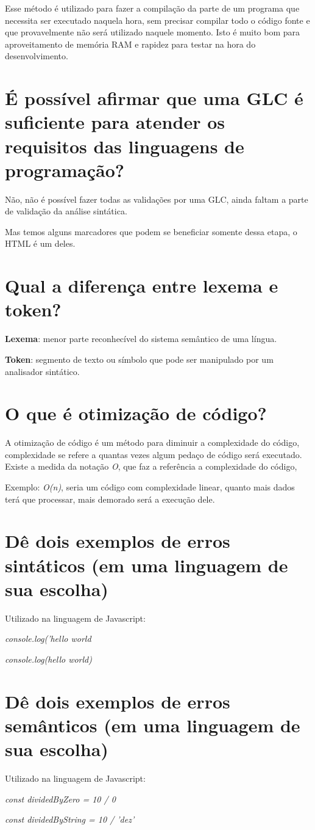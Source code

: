 \documentclass{article}
\begin{document}
Esse método é utilizado para fazer a compilação da parte de um programa que necessita ser executado naquela hora,
sem precisar compilar todo o código fonte e que provavelmente não será utilizado naquele momento.
Isto é muito bom para aproveitamento de memória RAM e rapidez para testar na hora do desenvolvimento.

\section{É possível afirmar que uma GLC é suficiente para atender os requisitos das linguagens de programação?}

Não, não é possível fazer todas as validações por uma GLC,
ainda faltam a parte de validação da análise sintática.

Mas temos alguns marcadores que podem se beneficiar somente dessa etapa, o HTML é um deles.

\section{Qual a diferença entre lexema e token?}

\textbf{Lexema}: menor parte reconhecível do sistema semântico de uma língua.

\textbf{Token}: segmento de texto ou símbolo que pode ser manipulado por um analisador sintático.

\section{O que é otimização de código?}

A otimização de código é um método para diminuir a complexidade do código,
complexidade se refere a quantas vezes algum pedaço de código será executado.
Existe a medida da notação \emph{O}, que faz a referência a complexidade do código,

Exemplo: \emph{O(n)}, seria um código com complexidade linear, quanto mais dados terá que processar, mais demorado será a execução dele.

\section{Dê dois exemplos de erros sintáticos (em uma linguagem de sua escolha)}

Utilizado na linguagem de Javascript:

\emph{console.log('hello world}

\emph{console.log(hello world)}

\section{Dê dois exemplos de erros semânticos (em uma linguagem de sua escolha)}

Utilizado na linguagem de Javascript:

\emph{const dividedByZero = 10 / 0}

\emph{const dividedByString = 10 / 'dez'}
\end{document}
